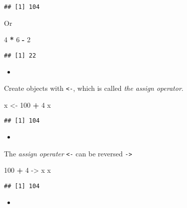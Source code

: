 \documentclass[]{book}
\newenvironment{Shaded}{\begin{snugshade}}{\end{snugshade}}
\newcommand{\DecValTok}[1]{\textcolor[rgb]{0.00,0.00,0.81}{#1}}
\newcommand{\NormalTok}[1]{#1}
\newcommand{\OperatorTok}[1]{\textcolor[rgb]{0.81,0.36,0.00}{\textbf{#1}}}
\newcommand{\StringTok}[1]{\textcolor[rgb]{0.31,0.60,0.02}{#1}}
\begin{document}
\begin{verbatim}
## [1] 104
\end{verbatim}

Or

\begin{Shaded}
\begin{Highlighting}[]
\DecValTok{4} \OperatorTok{*}\StringTok{ }\DecValTok{6} \OperatorTok{-}\StringTok{ }\DecValTok{2}
\end{Highlighting}
\end{Shaded}

\begin{verbatim}
## [1] 22
\end{verbatim}

\begin{itemize}
\item
\end{itemize}

Create objects with \texttt{\textless{}-}, which is called \emph{the assign operator}.

\begin{Shaded}
\begin{Highlighting}[]
\NormalTok{x <-}\StringTok{ }\DecValTok{100} \OperatorTok{+}\StringTok{ }\DecValTok{4}
\NormalTok{x}
\end{Highlighting}
\end{Shaded}

\begin{verbatim}
## [1] 104
\end{verbatim}

\begin{itemize}
\item
\end{itemize}

The \emph{assign operater} \texttt{\textless{}-} can be reversed \texttt{-\textgreater{}}

\begin{Shaded}
\begin{Highlighting}[]
\DecValTok{100} \OperatorTok{+}\StringTok{ }\DecValTok{4}\NormalTok{ ->}\StringTok{ }\NormalTok{x}
\NormalTok{x}
\end{Highlighting}
\end{Shaded}

\begin{verbatim}
## [1] 104
\end{verbatim}

\begin{itemize}
\item
\end{itemize}
\end{document}
